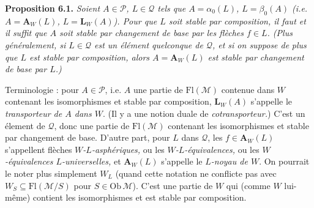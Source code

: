 \documentclass[11pt]{article}
\newcommand{\msp}[1]{\marginpar{\footnotesize [#1]}}
\newcommand{\Fl}{\mathrm{Fl}}
\begin{document}
\textbf{Proposition 6.1.} \textit{Soient $A \in \mathcal{P}$, $L \in \mathcal{Q}$ tels que $A = \alpha_0(L)$, $L = \beta_0(A)$ (i.e. $A = \mathbf{A}_W(L)$, $L = \mathbf{L}_W(A)$). Pour que $L$ soit stable par composition, il faut et il suffit que $A$ soit stable par changement de base par les flèches $f \in L$. (Plus généralement, si $L \in \mathcal{Q}$ est un élément quelconque de $\mathcal{Q}$, et si on suppose de} \msp{page 88} \textit{plus que $L$ est stable par composition, alors $A = \mathbf{A}_W(L)$ est stable par changement de base par $L$.)}

Terminologie : pour $A \in \mathcal{P}$, i.e. $A$ une partie de $\Fl(\mathcal{M})$ contenue dans $W$ contenant les isomorphismes et stable par composition, $\mathbf{L}_W(A)$ s'appelle le \textit{transporteur de $A$ dans $W$}. (Il y a une notion duale de \textit{cotransporteur.}) C'est un élement de $\mathcal{Q}$, donc une partie de $\Fl(\mathcal{M})$ contenant les isomorphismes et stable par changement de base. D'autre part, pour $L$ dans $\mathcal{Q}$, les $f \in \mathbf{A}_W(L)$ s'appellent flèches \textit{$W$-$L$-asphériques,} ou les \textit{$W$-$L$-équivalences,} ou les \textit{$W$-équivalences $L$-universelles,} et $\mathbf{A}_W(L)$ s'appelle le \textit{$L$-noyau de $W$}. On pourrait le noter plus simplement $W_L$ (quand cette notation ne conflicte pas avec $W_S \subseteq \Fl(\mathcal{M}/S)$ pour $S \in \mathrm{Ob}\,\mathcal{M}$). C'est une partie de $W$ qui (comme $W$ lui-même) contient les isomorphismes et est stable par composition. %
\end{document}
